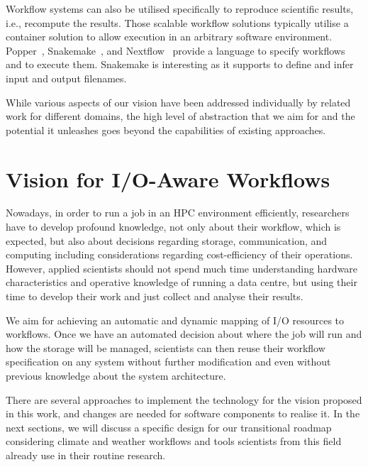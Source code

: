 \documentclass{superfri}
\begin{document}

Workflow systems can also be utilised specifically to reproduce scientific results, i.e., recompute the results.
Those scalable workflow solutions typically utilise a container solution to allow execution in an arbitrary software environment.
Popper~\cite{jimenez2017popper}, Snakemake~\cite{bts480}, and Nextflow~\cite{Nextflow} provide a language to specify workflows and to execute them.
Snakemake is interesting as it supports to define and infer input and output filenames.

While various aspects of our vision have been addressed individually by related work for different domains, the high level of abstraction that we aim for and the potential it unleashes goes beyond the capabilities of existing approaches.


\section{Vision for I/O-Aware Workflows}
\label{sec:vision}

Nowadays, in order to run a job in an HPC environment efficiently, researchers have to develop profound knowledge, not only about their workflow, which is expected, but also about decisions regarding storage, communication, and computing including considerations regarding cost-efficiency of their operations.
However, applied scientists should not spend much time understanding hardware characteristics and operative knowledge of running a data centre, but using their time to develop their work and just collect and analyse their results.

We aim for achieving an automatic and dynamic mapping of I/O resources to workflows.
Once we have an automated decision about where the job will run and how the storage will be managed, scientists can then reuse their workflow specification on any system without further modification and even without previous knowledge about the system architecture.

There are several approaches to implement the technology for the vision proposed in this work, and changes are needed for software components to realise it.
In the next sections, we will discuss a specific design for our transitional roadmap considering climate and weather workflows and tools scientists from this field already use in their routine research.
\end{document}
